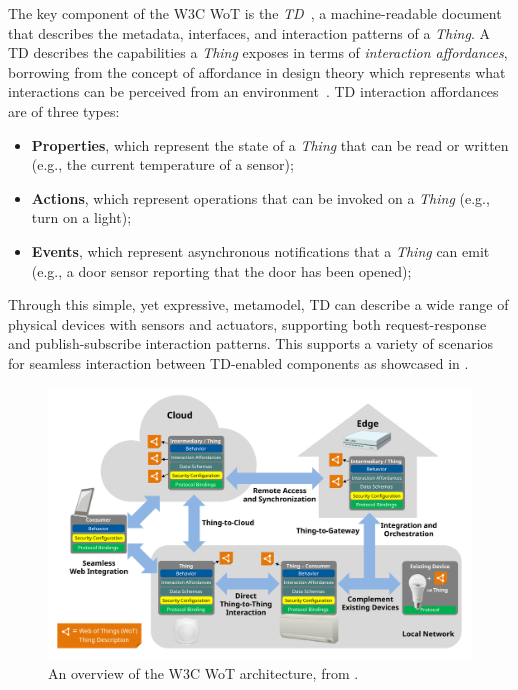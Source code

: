 The key component of the \ac{W3C} \ac{WoT} is the \emph{\ac{TD}}~\cite{wot-td}, a machine-readable document that describes the metadata, interfaces, and interaction patterns of a \emph{Thing}.
%
A \ac{TD} describes the capabilities a \emph{Thing} exposes in terms of \emph{interaction affordances}, borrowing from the concept of affordance in design theory which represents what interactions can be perceived from an environment~\cite{Gibson_2014,Norman_2013}.
%
\ac{TD} interaction affordances are of three types: 
\begin{itemize}
    \item \textbf{Properties}, which represent the state of a \emph{Thing} that can be read or written (e.g., the current temperature of a sensor);
    \item \textbf{Actions}, which represent operations that can be invoked on a \emph{Thing} (e.g., turn on a light);
    \item \textbf{Events}, which represent asynchronous notifications that a \emph{Thing} can emit (e.g., a door sensor reporting that the door has been opened);
\end{itemize}
%
Through this simple, yet expressive, metamodel, \ac{TD} can describe a wide range of physical devices with sensors and actuators, supporting both request-response and publish-subscribe interaction patterns.
%
This supports a variety of scenarios for seamless interaction between \ac{TD}-enabled components as showcased in . 

\begin{figure}[t]
    \centering
    \includegraphics[width=\textwidth]{figures/wotarch.pdf}
    \caption{An overview of the \ac{W3C} \ac{WoT} architecture, from \cite{wot-arch}.}
    \label{fig:wot-arch}
\end{figure}

